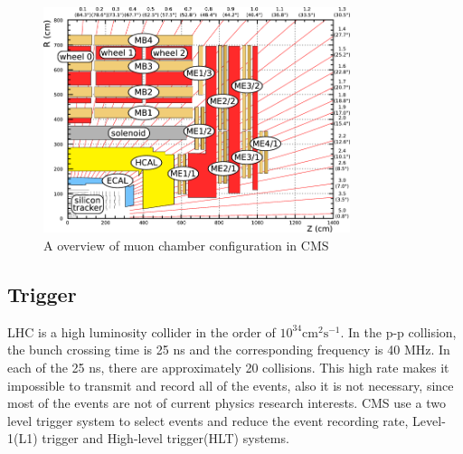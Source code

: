 \begin{figure}[htbp] 
\centering
\includegraphics[width=0.8\textwidth]{chapter3/Muon_chambers.png}
\caption{A overview of muon chamber configuration in CMS~\cite{Muon_chambers}}
\label{fig:muon_sketch}
\end{figure}


\subsection{Trigger}

LHC is a high luminosity collider in the order of $10^{34}\textrm{cm}^{2}\textrm{s}^{-1}$. In the p-p collision, the bunch crossing time is 25 ns and the corresponding frequency is 40 MHz. In each of the 25 ns, there are approximately 20 collisions. This high rate makes it impossible to transmit and record all of the events, also it is not necessary, since most of the events are not of current physics research interests. CMS use a two level trigger system to select events and reduce the event recording rate, Level-1(L1) trigger and High-level trigger(HLT) systems. 


